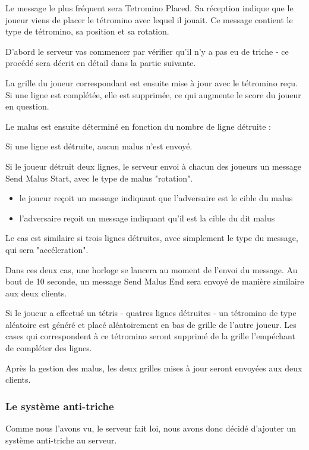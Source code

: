 \documentclass[a4paper, 12pt]{article}
\begin{document}
 
			Le message le plus fréquent sera Tetromino Placed. Sa réception indique que le joueur viens de placer le tétromino avec lequel il jouait. Ce message contient le type de tétromino, sa position et sa rotation. 

			D'abord le serveur vas commencer par vérifier qu'il n'y a pas eu de triche - ce procédé sera décrit en détail dans la partie suivante. 


			La grille du joueur correspondant est ensuite mise à jour avec le tétromino reçu.
			Si une ligne est complétée, elle est supprimée, ce qui augmente le score du joueur en question.


			Le malus est ensuite déterminé en fonction du nombre de ligne détruite :

			Si une ligne est détruite, aucun malus n'est envoyé.

			Si le joueur détruit deux lignes, le serveur envoi à chacun des joueurs un message Send Malus Start, avec le type de malus "rotation".

			\begin{itemize}
				\item le joueur reçoit un message indiquant que l'adversaire est le cible du malus
				\item l'adversaire reçoit un message indiquant qu'il est la cible du dit malus
			\end{itemize}

			Le cas est similaire si trois lignes détruites, avec simplement le type du message, qui sera "accéleration".

			Dans ces deux cas, une horloge se lancera au moment de l'envoi du message. Au bout de 10 seconde, un message Send Malus End sera envoyé de manière similaire aux deux clients.

			Si le joueur a effectué un tétris - quatres lignes détruites - un tétromino de type aléatoire est généré et placé aléatoirement en bas de grille de l'autre joueur. Les cases qui correspondent à ce tétromino seront supprimé de la grille l'empéchant de compléter des lignes.

			Après la gestion des malus, les deux grilles mises à jour seront envoyées aux deux clients.
				
		\subsubsection{Le système anti-triche}
			Comme nous l'avons vu, le serveur fait loi, nous avons donc décidé d'ajouter un système anti-triche au serveur.
\end{document}
